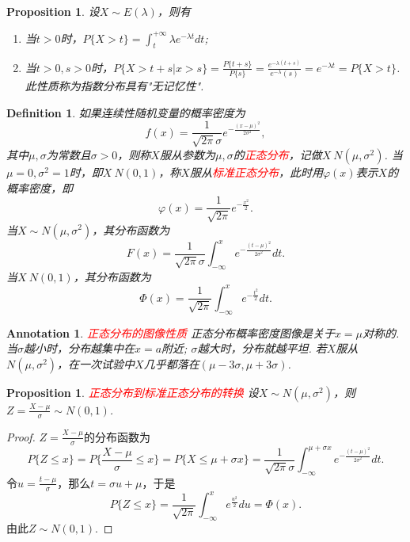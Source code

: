 \documentclass{article}
\newtheorem{proposition}[theorem]{Proposition}
\newtheorem{definition}[theorem]{Definition}
\newtheorem{annotation}[theorem]{Annotation}
\newcommand{\redt}[1]{\textcolor{red}{#1}}
\begin{document}
\begin{proposition}
\rm 设$X \sim E(\lambda)$，则有
\begin{enumerate}
	\item 当$t > 0$时，$P\{X > t\} = \int_t^{+\infty} \lambda e^{-\lambda t}dt$;
	\item 当$t > 0, s >0$时，$P\{X > t+s |x > s\} = \frac{P\{t+s\}}{P\{s\}} = \frac{e^{-\lambda(t+s)}}{e^{-\lambda}(s)} = e^{-\lambda t} = P\{X > t\}$. 此性质称为指数分布具有"无记忆性". 
\end{enumerate}
\end{proposition}

\begin{definition}
\rm 如果连续性随机变量的概率密度为
$$
f(x) = \frac{1}{\sqrt{2\pi}\sigma}e^{-\frac{(x-\mu)^2}{2\sigma^2}},
$$
其中$\mu,\sigma$为常数且$\sigma > 0$，则称$X$服从参数为$\mu,\sigma$的\redt{正态分布}，记做$X~N(\mu,\sigma^2)$. 当$\mu=0,\sigma^2 =1$时，即$X~N(0,1)$，称$X$服从\redt{标准正态分布}，此时用$\varphi(x)$表示$X$的概率密度，即
$$
\varphi(x) = \frac{1}{\sqrt{2\pi}}e^{-\frac{x^2}{2}}.
$$
当$X \sim N(\mu,\sigma^2)$，其分布函数为
$$
F(x) = \frac{1}{\sqrt{2\pi}\sigma}\int_{-\infty}^{x}e^{-\frac{(t-\mu)^2}{2\sigma^2}}dt. 
$$
当$X~N(0,1)$，其分布函数为
$$
\Phi(x) = \frac{1}{\sqrt{2\pi}}\int_{-\infty}^x e^{-\frac{t^2}{2}}dt.
$$
\end{definition}

\begin{annotation}
\rm \redt{正态分布的图像性质} 正态分布概率密度图像是关于$x = \mu$对称的. 当$\sigma$越小时，分布越集中在$x=a$附近; $\sigma$越大时，分布就越平坦. 若$X$服从$N(\mu,\sigma^2)$，在一次试验中$X$几乎都落在$(\mu-3\sigma,\mu + 3\sigma)$.
\end{annotation}

\begin{proposition}
\rm \redt{正态分布到标准正态分布的转换} 设$X \sim N(\mu,\sigma^2)$，则$Z = \frac{X-\mu}{\sigma} \sim N(0,1)$. 
\end{proposition}

\begin{proof}
\rm $Z=\frac{X-\mu}{\sigma}$的分布函数为
$$
P\{Z \leq x\} = P\{\frac{X-\mu}{\sigma} \leq x\} = P\{X \leq \mu + \sigma x\} =  \frac{1}{\sqrt{2\pi}\sigma}\int_{-\infty}^{\mu+\sigma x}e^{-\frac{(t-\mu)^2}{2\sigma^2}}dt.
$$
令$u = \frac{t-\mu}{\sigma}$，那么$t = \sigma u + \mu$，于是
$$
P\{Z \leq x\} = \frac{1}{\sqrt{2\pi}}\int_{-\infty}^{x} e^{\frac{u^2}{2}}du = \Phi(x). 
$$
由此$Z \sim N(0,1)$.
\end{proof}
\end{document}
